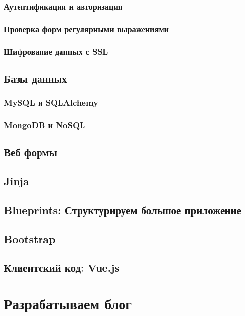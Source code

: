 

\subsection{Аутентификация и авторизация}

\subsection{Проверка форм регулярными выражениями}

\subsection{Шифрование данных с SSL}

\section{Базы данных}

\subsection{MySQL и SQLAlchemy}

\subsection{MongoDB и NoSQL}

\section{Веб формы}

\section{Jinja}

\section{Blueprints: Структурируем большое приложение}

\section{Bootstrap}

\section{Клиентский код: Vue.js}

\chapter{Разрабатываем блог}


